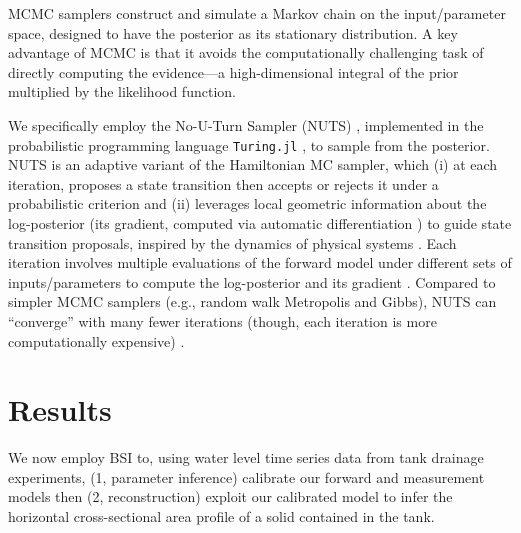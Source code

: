 \documentclass[a4paper,fleqn]{cas-dc}
\begin{document}
MCMC samplers construct and simulate a Markov chain \cite{dobrow2016introduction} on the input/parameter space, designed to have the posterior as its stationary distribution.
A key advantage of MCMC is that it avoids the computationally challenging task of directly computing the evidence---a high-dimensional integral of the prior multiplied by the likelihood function. \cite{van2021bayesian}

We specifically employ the No-U-Turn Sampler (NUTS) \cite{hoffman2014no}, implemented in the probabilistic programming language \cite{gordon2014probabilistic} \texttt{Turing.jl} \cite{ge2018turing,xu2020advancedhmc}, to sample from the posterior.
NUTS is an adaptive variant of the Hamiltonian MC \cite{betancourt2017conceptual} sampler, which (i) at each iteration, proposes a state transition then accepts or rejects it under a probabilistic criterion and (ii) leverages local geometric information about the log-posterior (its gradient, computed via automatic differentiation \cite{baydin2018automatic}) to guide state transition proposals, inspired by the dynamics of physical systems \cite{duane1987hybrid}.
Each iteration involves multiple evaluations of the forward model under different sets of inputs/parameters to compute the log-posterior and its gradient \cite{paun2022emulation,patel2024multi}. 
Compared to simpler MCMC samplers (e.g., random walk Metropolis and Gibbs), NUTS can ``converge'' \cite{roy2020convergence} with many fewer iterations
(though, each iteration is more computationally expensive)
\cite{chong2017comparison,hoffman2014no,robert2018accelerating,shi2024bayesian,turner2017well}.



\section{Results}
We now employ BSI to, using water level time series data from tank drainage experiments,  
(1, parameter inference) calibrate our forward and measurement models then
(2, reconstruction) exploit our calibrated model to infer the horizontal cross-sectional area profile of a solid contained in the tank.
\end{document}

